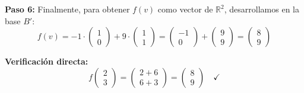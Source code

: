 \begin{ejemplo}
\vspace{0.5em}
\textbf{Paso 6:} Finalmente, para obtener \(f(v)\) como vector de \(\mathbb{R}^2\), desarrollamos en la base \(B'\):
\[
f(v) = -1 \cdot \begin{pmatrix}1 \\ 0\end{pmatrix} + 9 \cdot \begin{pmatrix}1 \\ 1\end{pmatrix}
= \begin{pmatrix}-1 \\ 0\end{pmatrix} + \begin{pmatrix}9 \\ 9\end{pmatrix} = \begin{pmatrix}8 \\ 9\end{pmatrix}
\]

\textbf{Verificación directa:}
\[
f\begin{pmatrix}2 \\ 3\end{pmatrix} = \begin{pmatrix}2 + 6 \\ 6 + 3\end{pmatrix} = \begin{pmatrix}8 \\ 9\end{pmatrix}
\quad \checkmark
\]
\end{ejemplo}
